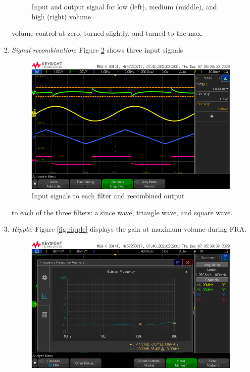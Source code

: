 \documentclass[notitlepage, 12pt]{report}
\begin{document}
\begin{enumerate}
\begin{figure}
        \caption{Input and output signal for low (left), medium (middle), and high (right) volume}
        \label{fig:volume}
    \end{figure}
    volume control at zero, turned slightly, and turned to the max.
    \item \emph{Signal recombination}: Figure \ref{fig:signalsummation} shows three input signals
    \begin{figure}    
        \begin{center}
            \includegraphics[scale=0.4]{images/addedsignals.png}  
        \end{center}
        \caption{Input signals to each filter and recombined output}
        \label{fig:signalsummation}
    \end{figure}
    to each of the three filters: a since wave, triangle wave, and square wave.
    \item \emph{Ripple}: Figure \ref{fig:ripple} displays the gain at maximum volume during FRA.
    \begin{figure}    
        \begin{center}
            \includegraphics[scale=0.4]{images/ripple.png}  

\end{center}
\end{figure}
\end{enumerate}
\end{document}

